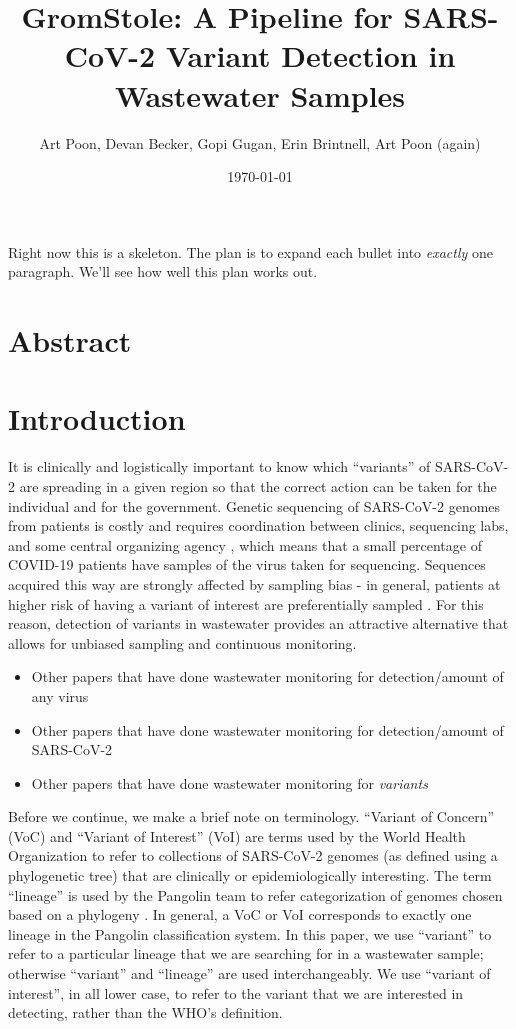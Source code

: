 \documentclass{article}
\title{GromStole: A Pipeline for SARS-CoV-2 Variant Detection in Wastewater Samples}
\author{Art Poon, Devan Becker, Gopi Gugan, Erin Brintnell, Art Poon (again)}
\date{\today}
\newenvironment{tightemize}
{ \begin{itemize}
    \setlength{\itemsep}{0pt}
    \setlength{\parskip}{0pt}
    \setlength{\parsep}{0pt}     }
{ \end{itemize}                  }
\begin{document}
\maketitle

Right now this is a skeleton. 
The plan is to expand each bullet into \emph{exactly} one paragraph. 
We'll see how well this plan works out.


\section*{Abstract}

\section{Introduction}

It is clinically and logistically important to know which ``variants'' of SARS-CoV-2 are spreading in a given region so that the correct action can be taken for the individual and for the government.
Genetic sequencing of SARS-CoV-2 genomes from patients is costly and requires coordination between clinics, sequencing labs, and some central organizing agency \citep{needed}, which means that a small percentage of COVID-19 patients have samples of the virus taken for sequencing.
Sequences acquired this way are strongly affected by sampling bias - in general, patients at higher risk of having a variant of interest are preferentially sampled \citep{needed}.
For this reason, detection of variants in wastewater provides an attractive alternative that allows for unbiased sampling and continuous monitoring. 


\begin{tightemize}
    \item Other papers that have done wastewater monitoring for detection/amount of any virus
    \item Other papers that have done wastewater monitoring for detection/amount of SARS-CoV-2
    \item Other papers that have done wastewater monitoring for \emph{variants}
\end{tightemize}

Before we continue, we make a brief note on terminology. 
``Variant of Concern'' (VoC) and ``Variant of Interest'' (VoI) are terms used by the World Health Organization \citep[WHO, ][]{needed} to refer to collections of SARS-CoV-2 genomes (as defined using a phylogenetic tree) that are clinically or epidemiologically interesting. 
The term ``lineage'' is used by the Pangolin team to refer categorization of genomes chosen based on a phylogeny \citep{needed}.
In general, a VoC or VoI corresponds to exactly one lineage in the Pangolin classification system.
In this paper, we use ``variant'' to refer to a particular lineage that we are searching for in a wastewater sample; otherwise ``variant'' and ``lineage'' are used interchangeably.
We use ``variant of interest'', in all lower case, to refer to the variant that we are interested in detecting, rather than the WHO's definition.
\end{document}
